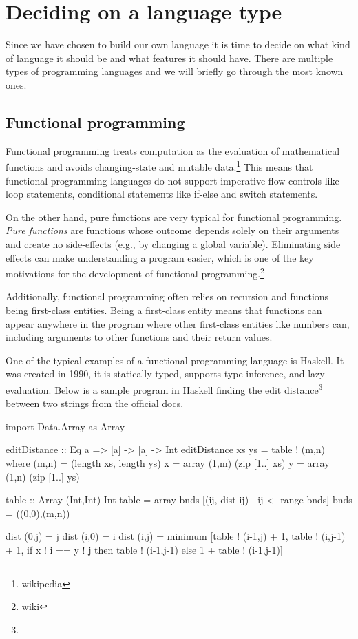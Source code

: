\section{Deciding on a language type}
Since we have chosen to build our own language it is time to decide on what kind of language it should be and what features it should have. There are
multiple types of programming languages and we will briefly go through the most known ones.

\subsection{Functional programming}
Functional programming treats computation as the evaluation of mathematical functions and avoids changing-state and mutable data.\footnote{wikipedia}
This means that functional programming languages do not support imperative flow controls like loop statements, conditional statements like if-else and
switch statements.

On the other hand, pure functions are very typical for functional programming. \emph{Pure functions} are functions whose outcome depends solely on their arguments
and create no side-effects (e.g., by changing a global variable). Eliminating side effects can make understanding a program easier, which is one of the
key motivations for the development of functional programming.\footnote{wiki}

Additionally, functional programming often relies on recursion and functions being first-class entities. Being a first-class entity means that functions can appear
anywhere in the program where other first-class entities like numbers can, including arguments to other functions and their return values.

One of the typical examples of a functional programming language is Haskell. It was created in 1990, it is statically typed, supports type inference,
and lazy evaluation. Below is a sample program in Haskell finding the edit distance\footnote{} between two strings from the official docs.
\begin{code}
import Data.Array as Array

editDistance :: Eq a => [a] -> [a] -> Int
editDistance xs ys = table ! (m,n)
    where
    (m,n) = (length xs, length ys)
    x     = array (1,m) (zip [1..] xs)
    y     = array (1,n) (zip [1..] ys)
    
    table :: Array (Int,Int) Int
    table = array bnds [(ij, dist ij) | ij <- range bnds]
    bnds  = ((0,0),(m,n))
    
    dist (0,j) = j
    dist (i,0) = i
    dist (i,j) = minimum [table ! (i-1,j) + 1, table ! (i,j-1) + 1,
        if x ! i == y ! j
            then table ! (i-1,j-1)
            else 1 + table ! (i-1,j-1)]
\end{code}

